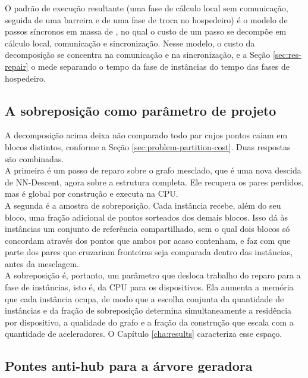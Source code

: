 O padrão de execução resultante (uma fase de cálculo local sem comunicação, seguida de uma barreira e de uma fase de troca no hospedeiro) é o modelo de passos síncronos em massa de , no qual o custo de um passo se decompõe em cálculo local, comunicação e sincronização. Nesse modelo, o custo da decomposição se concentra na comunicação e na sincronização, e a Seção \ref{sec:res-repair} o mede separando o tempo da fase de instâncias do tempo das fases de hospedeiro.\\

\subsection{A sobreposição como parâmetro de projeto\label{sec:adopted-overlap}}

A decomposição acima deixa não comparado todo par cujos pontos caiam em blocos distintos, conforme a Seção \ref{sec:problem-partition-cost}. Duas respostas são combinadas.\\

A primeira é um passo de reparo sobre o grafo mesclado, que é uma nova descida de NN-Descent, agora sobre a estrutura completa. Ele recupera os pares perdidos, mas é global por construção e executa na \ac{CPU}.\\

A segunda é a amostra de sobreposição. Cada instância recebe, além do seu bloco, uma fração adicional de pontos sorteados dos demais blocos. Isso dá às instâncias um conjunto de referência compartilhado, sem o qual dois blocos só concordam através dos pontos que ambos por acaso contenham, e faz com que parte dos pares que cruzariam fronteiras seja comparada dentro das instâncias, antes da mesclagem.\\

A sobreposição é, portanto, um parâmetro que desloca trabalho do reparo para a fase de instâncias, isto é, da \ac{CPU} para os dispositivos. Ela aumenta a memória que cada instância ocupa, de modo que a escolha conjunta da quantidade de instâncias e da fração de sobreposição determina simultaneamente a residência por dispositivo, a qualidade do grafo e a fração da construção que escala com a quantidade de aceleradores. O Capítulo \ref{cha:results} caracteriza esse espaço.\\

\subsection{Pontes anti-hub para a árvore geradora\label{sec:adopted-bridges}}

